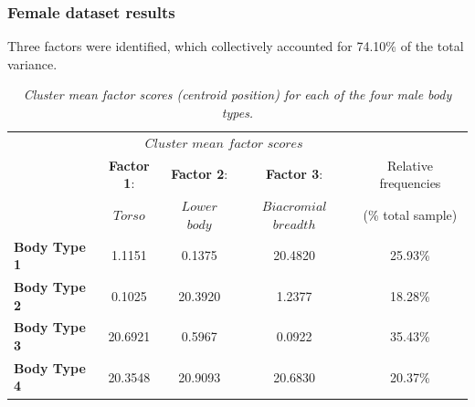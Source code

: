 \documentclass[12pt,a4paper,openany,UKenglish]{scrreprt}
\begin{document}
\subsubsection{Female dataset results}
Three factors were identified, which collectively accounted for 74.10\% of the total variance.
\begin{table}[H]
	\centering
	\caption{\footnotesize\centering\itshape Cluster mean factor scores (centroid position) for each of the four male body types.}
	{\sffamily\footnotesize
		\begin{tabular}{lcccc}
			\hline
			                     & \multicolumn{3}{c}{$Cluster$ $mean$ $factor$ $scores$}                                                                      \\
			\cline{2-4}
			                     & \textbf{Factor 1}:                                     & \textbf{Factor 2}: & \textbf{Factor 3}:     & Relative frequencies \\
			                     & $Torso$                                                & $Lower$ $body$     & $Biacromial$ $breadth$ & (\% total sample)    \\
			\hline
			\textbf{Body Type 1} & 1.1151                                                 & 0.1375             & 20.4820                & 25.93\%              \\
			\textbf{Body Type 2} & 0.1025                                                 & 20.3920            & 1.2377                 & 18.28\%              \\
			\textbf{Body Type 3} & 20.6921                                                & 0.5967             & 0.0922                 & 35.43\%              \\
			\textbf{Body Type 4} & 20.3548                                                & 20.9093            & 20.6830                & 20.37\%              \\
			\hline
		\end{tabular}
	}
\end{table}
\end{document}
